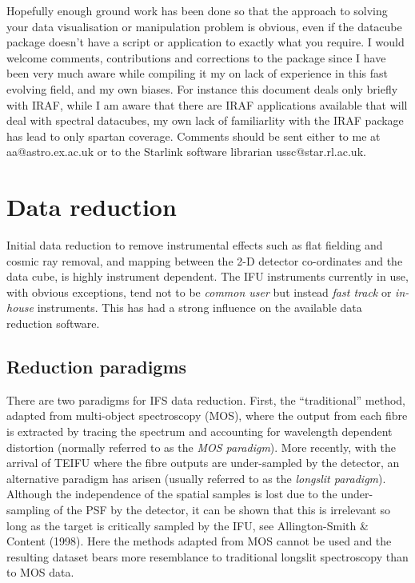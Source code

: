 \documentclass[twoside,11pt]{article}
\newcommand{\htmladdnormallink}[2]{#1}
\newcommand{\xlabel}[1]{}
\begin{document}
Hopefully enough ground work has been done so that the approach to solving your data visualisation or manipulation problem is obvious, even if the datacube package doesn't have a script or application to exactly what you require. I would welcome comments, contributions and corrections to the package since I have been very much aware while compiling it my on lack of experience in this fast evolving field, and my own biases. For instance this document deals only briefly with IRAF, while I am aware that there are IRAF applications available that will deal with spectral datacubes, my own lack of familiarlity with the IRAF package has lead to only spartan coverage. Comments should be sent either to me at \htmladdnormallink{aa@astro.ex.ac.uk}{mailto:aa@astro.ex.ac.uk} or to the Starlink software librarian \htmladdnormallink{ussc@star.rl.ac.uk}{mailto:ussc@star.rl.ac.uk}. 

\section{\xlabel{sc16_reduction}Data reduction\label{sc16_reduction}}

Initial data reduction to remove instrumental effects such as flat fielding and cosmic ray removal, and mapping between the 2-D detector co-ordinates and the data cube, is highly instrument dependent. The IFU instruments currently in use, with obvious exceptions, tend not to be {\em common user} but instead {\em fast track} or {\em in-house} instruments. This has had a strong influence on the available data reduction software.

\subsection{\xlabel{sc16_paradigms}Reduction paradigms\label{sc16_paradigms}}

There are two paradigms for IFS data reduction. First, the ``traditional'' method, adapted from multi-object spectroscopy (MOS), where the output from each fibre is extracted by tracing the spectrum and accounting for wavelength dependent distortion (normally referred to as the {\em MOS paradigm}). More recently, with the arrival of TEIFU where the fibre outputs are under-sampled by the detector, an alternative paradigm has arisen (usually referred to as the {\em longslit paradigm}). Although the independence of the spatial samples is lost due to the under-sampling of the PSF by the detector, it can be shown that this is irrelevant so long as the target is critically sampled by the IFU, see Allington-Smith \& Content (1998). Here the methods adapted from MOS cannot be used and the resulting dataset bears more resemblance to traditional longslit spectroscopy than to MOS data.
\end{document}
